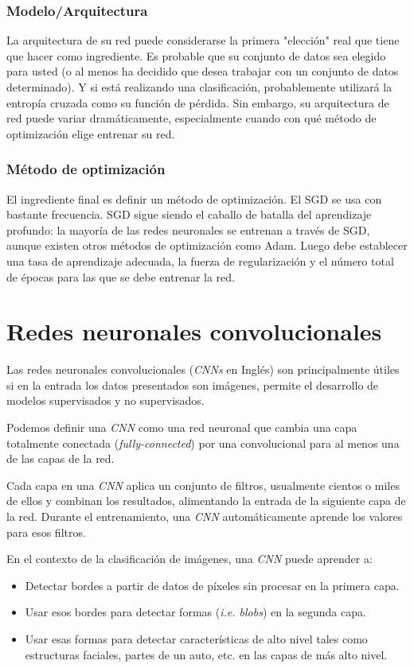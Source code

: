 \documentclass[a4paper,12pt]{article}
\begin{document}
\subsubsection{Modelo/Arquitectura}
La arquitectura de su red puede considerarse la primera "elección" real que tiene que hacer como ingrediente. Es probable que su conjunto de datos sea elegido para usted (o al menos ha decidido que desea trabajar con un conjunto de datos determinado). Y si está realizando una clasificación, probablemente utilizará la entropía cruzada como su función de pérdida.
Sin embargo, su arquitectura de red puede variar dramáticamente, especialmente cuando con qué método de optimización elige entrenar su red.

\subsubsection{Método de optimización}
El ingrediente final es definir un método de optimización. El SGD se usa con bastante frecuencia.
SGD sigue siendo el caballo de batalla del aprendizaje profundo: la mayoría de las redes neuronales se entrenan a través de SGD, aunque existen otros métodos de optimización como Adam.
Luego debe establecer una tasa de aprendizaje adecuada, la fuerza de regularización y el número total de épocas para las que se debe entrenar la red.

\clearpage

\section{Redes neuronales convolucionales}
Las redes neuronales convolucionales \citep{rosebrock2017deep} (\textit{CNNs} en Inglés) son principalmente útiles si en la entrada los datos presentados son imágenes, permite el desarrollo de modelos supervisados y no supervisados.

Podemos definir una \textit{CNN} como una red neuronal que cambia una capa totalmente conectada (\textit{fully-connected}) por una convolucional para al menos una de las capas de la red.

Cada capa en una \textit{CNN} aplica un conjunto de filtros, usualmente cientos o miles de ellos y combinan los resultados, alimentando la entrada de la siguiente capa de la red. Durante el entrenamiento, una \textit{CNN} automáticamente aprende los valores para esos filtros.

En el contexto de la clasificación de imágenes, una \textit{CNN} puede aprender a:
\begin{itemize}[noitemsep, topsep=2pt]
	\item Detectar bordes a partir de datos de píxeles sin procesar en la primera capa.
	\item Usar esos bordes para detectar formas (\textit{i.e. blobs}) en la segunda capa.
	\item Usar esas formas para detectar características de alto nivel tales como estructuras faciales, partes de un auto, etc. en las capas de más alto nivel.
\end{itemize}
\end{document}
